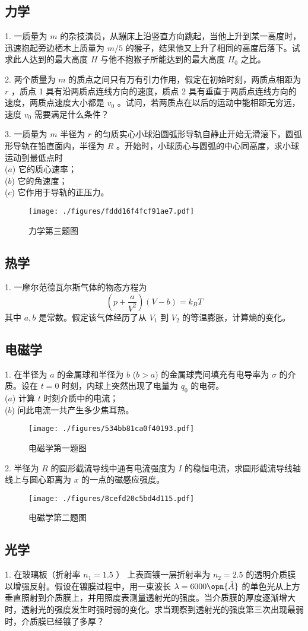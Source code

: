 \subsection{力学}
1. 一质量为 $m$ 的杂技演员，从蹦床上沿竖直方向跳起，当他上升到某一高度时，迅速抱起旁边栖木上质量为 $m/5$ 的猴子，结果他又上升了相同的高度后落下。试求此人达到的最大高度 $H$ 与他不抱猴子所能达到的最大高度 $H_{0}$ 之比。

2. 两个质量为 $m$ 的质点之间只有万有引力作用，假定在初始时刻，两质点相距为 $r$ ，质点 1 具有沿两质点连线方向的速度，质点 2 具有垂直于两质点连线方向的速度，两质点速度大小都是 $v_{0}$ 。试问，若两质点在以后的运动中能相距无穷远，速度 $v_0$ 需要满足什么条件？

3. 一质量为 $m$ 半径为 $r$ 的匀质实心小球沿圆弧形导轨自静止开始无滑滚下，圆弧形导轨在铅直面内，半径为 $R$ 。开始时，小球质心与圆弧的中心同高度，求小球运动到最低点时\\ 
($a$) 它的质心速率；\\
($b$) 它的角速度；\\
($c$) 它作用于导轨的正压力。
\begin{figure}[ht]
\centering
\texttt{[image: ./figures/fddd16f4fcf91ae7.pdf]}
\caption{力学第三题图} \label{fig_NJU17_1}
\end{figure}
\subsection{热学}
1. 一摩尔范德瓦尔斯气体的物态方程为 
\begin{equation}
\left(p+\frac{a}{V^{2}}\right)(V-b)=k_{B} T
\end{equation}
其中 $a, b$ 是常数。假定该气体经历了从 $V_{1}$ 到 $V_{2}$ 的等温膨胀，计算熵的变化。
\subsection{电磁学}
1. 在半径为 $a$ 的金属球和半径为 $b$ ($b>a$) 的金属球壳间填充有电导率为 $\sigma$ 的介质。设在 $t=0$ 时刻，内球上突然出现了电量为 $q_0$ 的电荷。\\
($a$) 计算 $t$ 时刻介质中的电流；\\
($b$) 问此电流一共产生多少焦耳热。
\begin{figure}[ht]
\centering
\texttt{[image: ./figures/534bb81ca0f40193.pdf]}
\caption{电磁学第一题图} \label{fig_NJU17_2}
\end{figure}
2. 半径为 $R$ 的圆形截流导线中通有电流强度为 $I$ 的稳恒电流，求圆形截流导线轴线上与圆心距离为 $x$ 的一点的磁感应强度。
\begin{figure}[ht]
\centering
\texttt{[image: ./figures/8cefd20c5bd4d115.pdf]}
\caption{电磁学第二题图} \label{fig_NJU17_3}
\end{figure}
\subsection{光学}
1. 在玻璃板（折射率 $n_{1}=1.5$ ） 上表面镀一层折射率为 $n_{2}=2.5$ 的透明介质膜以增强反射。假设在镀膜过程中，用一束波长 $\lambda=6000 \opn{\mathring{A}}$ 的单色光从上方垂直照射到介质膜上，并用照度表测量透射光的强度。当介质膜的厚度逐渐增大时，透射光的强度发生时强时弱的变化。求当观察到透射光的强度第三次出现最弱时，介质膜已经镀了多厚？